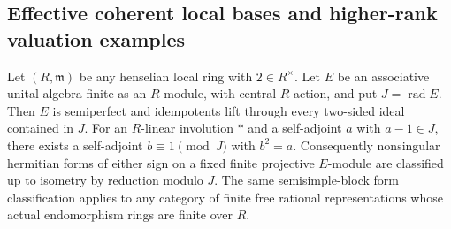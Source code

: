 \subsection{Effective coherent local bases and higher-rank valuation examples}
\label{C:coherent-henselizations-subsection}

\begin{lemma}
\label{C:nonnoetherian-henselian-lifting}
Let $(R,\mathfrak m)$ be any henselian local ring
with $2\in R^\times$.  Let $E$ be an associative
unital algebra finite as an $R$-module, with central
$R$-action, and put $J=\operatorname{rad}E$.
Then $E$ is semiperfect and idempotents lift through
every two-sided ideal contained in $J$.
For an $R$-linear involution $*$ and a self-adjoint
$a$ with $a-1\in J$, there exists a self-adjoint
$b\equiv1\pmod J$ with $b^2=a$.
Consequently nonsingular hermitian forms of either
sign on a fixed finite projective $E$-module are
classified up to isometry by reduction modulo $J$.
The same semisimple-block form classification
applies to any category of finite free rational
representations whose actual endomorphism rings
are finite over $R$.
\end{lemma}
